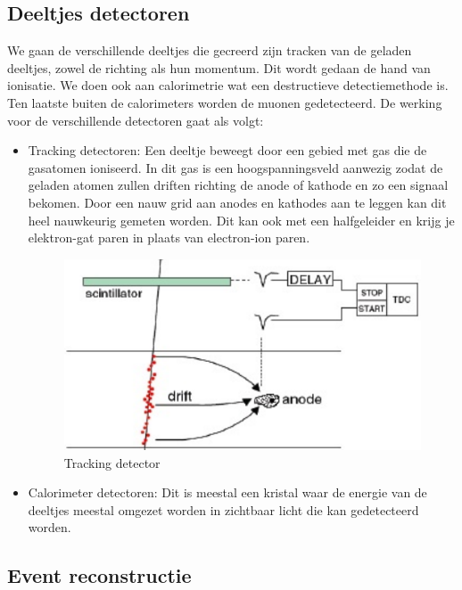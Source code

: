 \documentclass[../main.tex]{subfiles}
\begin{document}
\subsection{Deeltjes detectoren}%
\label{sub:deeltjes_detectoren}

We gaan de verschillende deeltjes die gecreerd zijn tracken van de geladen deeltjes, zowel de richting als hun momentum. Dit wordt gedaan de hand van ionisatie. We doen ook aan calorimetrie wat een destructieve detectiemethode is. Ten laatste buiten de calorimeters worden de muonen gedetecteerd. De werking voor de verschillende detectoren gaat als volgt:
\begin{itemize}
    \item Tracking detectoren: Een deeltje beweegt door een gebied met gas die de gasatomen ioniseerd. In dit gas is een hoogspanningsveld aanwezig zodat de geladen atomen zullen driften richting de anode of kathode en zo een signaal bekomen. Door een nauw grid aan anodes en kathodes aan te leggen kan dit heel nauwkeurig gemeten worden. Dit kan ook met een halfgeleider en krijg je elektron-gat paren in plaats van electron-ion paren.
        \begin{figure}[h]
            \centering
            \includegraphics[width=0.8\linewidth]{introduction_and_review/tracking_detector.png}
            \caption{Tracking detector}%
            \label{fig:tracking_detector}
        \end{figure}
    \item Calorimeter detectoren: Dit is meestal een kristal waar de energie van de deeltjes meestal omgezet worden in zichtbaar licht die kan gedetecteerd worden.
\end{itemize}

\subsection{Event reconstructie}%
\label{sub:event_reconstructie}
\end{document}
